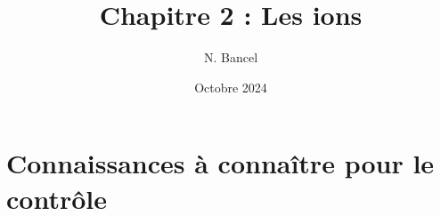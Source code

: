 \documentclass[a4paper,12pt]{article}
\begin{document}
\title{Chapitre 2 : Les ions}
\author{N. Bancel}
\date{Octobre 2024}
\maketitle

\section{Connaissances à connaître pour le contrôle}
\end{document}
